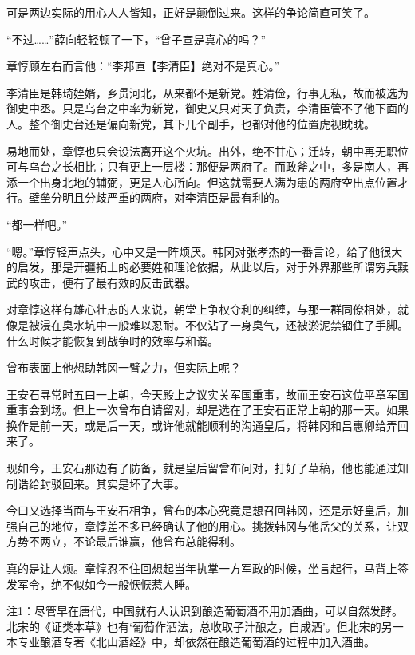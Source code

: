 可是两边实际的用心人人皆知，正好是颠倒过来。这样的争论简直可笑了。

“不过……”薛向轻轻顿了一下，“曾子宣是真心的吗？”

章惇顾左右而言他：“李邦直【李清臣】绝对不是真心。”

李清臣是韩琦姪婿，乡贯河北，从来都不是新党。姓清俭，行事无私，故而被选为御史中丞。只是乌台之中率为新党，御史又只对天子负责，李清臣管不了他下面的人。整个御史台还是偏向新党，其下几个副手，也都对他的位置虎视眈眈。

易地而处，章惇也只会设法离开这个火坑。出外，绝不甘心；迁转，朝中再无职位可与乌台之长相比；只有更上一层楼：那便是两府了。而政斧之中，多是南人，再添一个出身北地的辅弼，更是人心所向。但这就需要人满为患的两府空出点位置才行。壁垒分明且分歧严重的两府，对李清臣是最有利的。

“都一样吧。”

“嗯。”章惇轻声点头，心中又是一阵烦厌。韩冈对张孝杰的一番言论，给了他很大的启发，那是开疆拓土的必要姓和理论依据，从此以后，对于外界那些所谓穷兵黩武的攻击，便有了最有效的反击武器。

对章惇这样有雄心壮志的人来说，朝堂上争权夺利的纠缠，与那一群同僚相处，就像是被浸在臭水坑中一般难以忍耐。不仅沾了一身臭气，还被淤泥禁锢住了手脚。什么时候才能恢复到战争时的效率与和谐。

曾布表面上他想助韩冈一臂之力，但实际上呢？

王安石寻常时五曰一上朝，今天殿上之议实关军国重事，故而王安石这位平章军国重事会到场。但上一次曾布自请留对，却是选在了王安石正常上朝的那一天。如果换作是前一天，或是后一天，或许他就能顺利的沟通皇后，将韩冈和吕惠卿给弄回来了。

现如今，王安石那边有了防备，就是皇后留曾布问对，打好了草稿，他也能通过知制诰给封驳回来。其实是坏了大事。

今曰又选择当面与王安石相争，曾布的本心究竟是想召回韩冈，还是示好皇后，加强自己的地位，章惇差不多已经确认了他的用心。挑拨韩冈与他岳父的关系，让双方势不两立，不论最后谁赢，他曾布总能得利。

真的是让人烦。章惇忍不住回想起当年执掌一方军政的时候，坐言起行，马背上签发军令，绝不似如今一般恹恹惹人睡。

注1：尽管早在唐代，中国就有人认识到酿造葡萄酒不用加酒曲，可以自然发酵。北宋的《证类本草》也有‘葡萄作酒法，总收取子汁酿之，自成酒’。但北宋的另一本专业酿酒专著《北山酒经》中，却依然在酿造葡萄酒的过程中加入酒曲。

